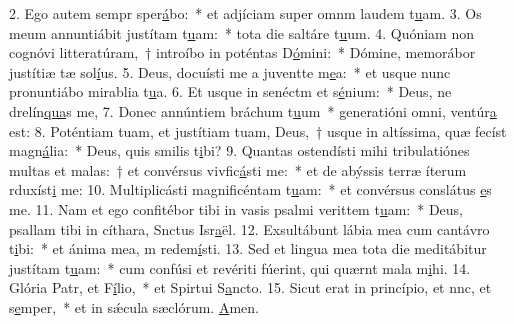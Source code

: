 2. Ego autem sempr sper\uline{á}bo:~* et adjíciam super omnm laudem t\uline{u}am.
3. Os meum annuntiábit justítam t\uline{u}am:~* tota die saltáre t\uline{u}um.
4. Quóniam non cognóvi litteratúram,~† introíbo in poténtas D\uline{ó}mini:~* Dómine, memorábor justítiæ tæ sol\uline{í}us.
5. Deus, docuísti me a juventte m\uline{e}a:~* et usque nunc pronuntiábo mirablia t\uline{u}a.
6. Et usque in senéctm et s\uline{é}nium:~* Deus, ne drelín\uline{qua}s me,
7. Donec annúntiem bráchum t\uline{u}um~* generatióni omni,  ventúr\uline{a} est:
8. Poténtiam tuam, et justítiam tuam, Deus,~† usque in altíssima, quæ fecíst magn\uline{á}lia:~* Deus, quis smilis t\uline{i}bi?
9. Quantas ostendísti mihi tribulatiónes multas et malas:~† et convérsus vivfic\uline{á}sti me:~* et de abýssis terræ íterum rduxíst\uline{i} me:
10. Multiplicásti magnificéntam t\uline{u}am:~* et convérsus conslátus \uline{e}s me.
11. Nam et ego confitébor tibi in vasis psalmi verittem t\uline{u}am:~* Deus, psallam tibi in cíthara, Snctus Isr\uline{a}ël.
12. Exsultábunt lábia mea cum cantávro t\uline{i}bi:~* et ánima mea, m redem\uline{í}sti.
13. Sed et lingua mea tota die meditábitur justítam t\uline{u}am:~* cum confúsi et revériti fúerint, qui quærnt mala m\uline{i}hi.
14. Glória Patr, et F\uline{í}lio,~* et Spirtui S\uline{a}ncto.
15. Sicut erat in princípio, et nnc, et s\uline{e}mper,~* et in sǽcula sæclórum. \uline{A}men.
